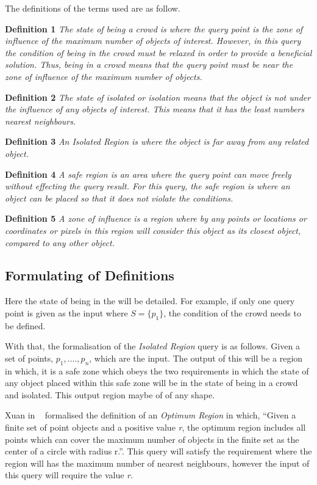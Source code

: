 \documentclass[a4paper,11pt]{article}
\begin{document}
The definitions of the terms used are as follow.

\textbf{Definition 1} \textit{The state of being a crowd is where the query point is the zone of influence of the maximum number of objects of interest. However, in this query the condition of being in the crowd must be relaxed in order to provide a beneficial solution. Thus, being in a crowd means that the query point must be near the zone of influence of the maximum number of objects.
}

\textbf{Definition 2} \textit{The state of isolated or isolation means that the object is not under the influence of any objects of interest. This means that it has the least numbers nearest neighbours. }

\textbf{Definition 3} \textit{An Isolated Region is where the object is far away from any related object.}

\textbf{Definition 4} \textit{A safe region is an area where the query point can move freely without effecting the query result. For this query, the safe region is where an object can be placed so that it does not violate the conditions.}

\textbf{Definition 5} \textit{A zone of influence is a region where by any points or locations or coordinates or pixels in this region will consider this object as its closest object, compared to any other object.}

\subsection{Formulating of Definitions}

Here the state of being in the  will be detailed. For example, if only one query point is given as the input where $S= \{ p_1\}$, the condition of the crowd needs to be defined. 



With that, the formalisation of the \textit{Isolated Region} query is as follows. Given a set of points, $p_1,....,p_n$, which are the input. The output of this will be a region in which, it is a safe zone which obeys the two requirements in which the state of any object placed within this safe zone will be in the state of being in a crowd and isolated. This output region maybe of of any shape.

Xuan in ~\cite{Xuan2012} formalised the definition of an \textit{Optimum Region} in which, ``Given a finite set of point objects and a positive value \textit{r}, the optimum region includes all points which can cover the maximum number of objects in the finite set as the center of a circle with radius r.''. This query will satisfy the requirement where the region will has the maximum number of nearest neighbours, however the input of this query will require the value \textit{r}.
\end{document}
